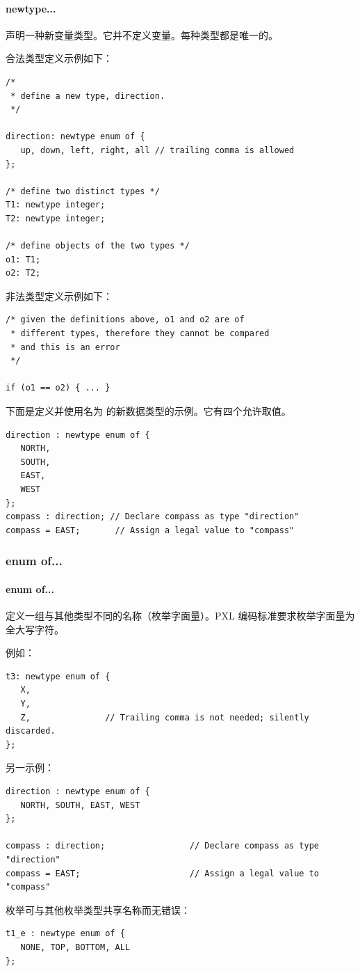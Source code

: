 \paragraph*{newtype...}

 声明一种新变量类型。它并不定义变量。每种类型都是唯一的。

合法类型定义示例如下：
\begin{lstlisting}[style=pxl]
/*
 * define a new type, direction.
 */

direction: newtype enum of {
   up, down, left, right, all // trailing comma is allowed
};

/* define two distinct types */
T1: newtype integer;
T2: newtype integer;

/* define objects of the two types */
o1: T1;
o2: T2;
\end{lstlisting}

非法类型定义示例如下：
\begin{lstlisting}[style=pxl]
/* given the definitions above, o1 and o2 are of
 * different types, therefore they cannot be compared
 * and this is an error
 */

if (o1 == o2) { ... }
\end{lstlisting}

下面是定义并使用名为  的新数据类型的示例。它有四个允许取值。
\begin{lstlisting}[style=pxl]
direction : newtype enum of {
   NORTH,
   SOUTH,
   EAST,
   WEST
};
compass : direction; // Declare compass as type "direction"
compass = EAST;       // Assign a legal value to "compass"
\end{lstlisting}

\subsubsection{enum of...}
\paragraph*{enum of...}

定义一组与其他类型不同的名称（枚举字面量）。PXL 编码标准要求枚举字面量为全大写字符。

例如：
\begin{lstlisting}[style=pxl]
t3: newtype enum of {
   X,
   Y,
   Z,               // Trailing comma is not needed; silently discarded.
};
\end{lstlisting}

另一示例：
\begin{lstlisting}[style=pxl]
direction : newtype enum of {
   NORTH, SOUTH, EAST, WEST
};

compass : direction;                 // Declare compass as type "direction"
compass = EAST;                      // Assign a legal value to "compass"
\end{lstlisting}

枚举可与其他枚举类型共享名称而无错误：
\begin{lstlisting}[style=pxl]
t1_e : newtype enum of {
   NONE, TOP, BOTTOM, ALL
};
\end{lstlisting}


